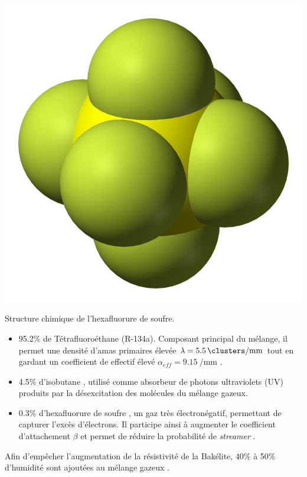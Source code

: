 \marginpar
{
	\centering
	\includegraphics[width=\marginparwidth]{RPC/Sulfurhexafluoride.png}
	\captionsetup{type=figure}\caption{Structure chimique de l'hexafluorure de soufre.}
	\label{hexa}
}

\begin{itemize}[label=$\bullet$]
\item \num{95.2}\% de Tétrafluoroéthane  (R-134a). Composant principal du mélange, il permet une densité d'amas primaires élevée $\lambda=\SI{5.5}{\clusters\per\milli\meter}$ tout en gardant un coefficient de  effectif élevé $\alpha_{eff}=\SI{9.15}{\per\milli\meter}$ \cite{CMS-NOTE-1997-004}.
\item \num{4.5}\% d'isobutane , utilisé comme absorbeur de photons ultraviolets (UV) produits par la désexcitation des molécules du mélange gazeux.
\item \num{0.3}\% d'hexafluorure de soufre , un gaz très électronégatif, permettant de capturer l'excès d'électrons. Il participe ainsi à augmenter le coefficient d'attachement $\beta$ et permet de réduire la probabilité de \textit{streamer} \cite{Camarri:685607}.
\end{itemize}

Afin d'empêcher l'augmentation de la résistivité de la Bakélite, \num{40}\% à \num{50}\% d'humidité sont ajoutées au mélange gazeux \cite{Abbrescia:2004fv}.

